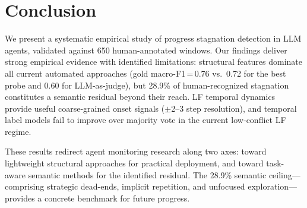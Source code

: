\documentclass[11pt]{article}
\begin{document}
\section{Conclusion}
\label{sec:conclusion}

We present a systematic empirical study of progress stagnation detection in LLM agents, validated against 650 human-annotated windows. Our findings deliver strong empirical evidence with identified limitations: structural features dominate all current automated approaches (gold macro-F1\,=\,0.76 vs.\ 0.72 for the best probe and 0.60 for LLM-as-judge), but 28.9\% of human-recognized stagnation constitutes a semantic residual beyond their reach. LF temporal dynamics provide useful coarse-grained onset signals ($\pm$2--3 step resolution), and temporal label models fail to improve over majority vote in the current low-conflict LF regime.

These results redirect agent monitoring research along two axes: toward lightweight structural approaches for practical deployment, and toward task-aware semantic methods for the identified residual. The 28.9\% semantic ceiling---comprising strategic dead-ends, implicit repetition, and unfocused exploration---provides a concrete benchmark for future progress.


\end{document}
